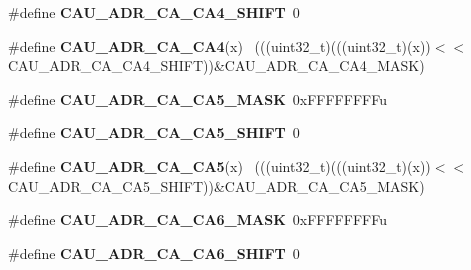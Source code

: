 \begin{DoxyCompactItemize}
\item 
\hypertarget{group___c_a_u___register___masks_gacd7b74188dccfc62f26f78229fb8a766}{}\#define {\bfseries C\+A\+U\+\_\+\+A\+D\+R\+\_\+\+C\+A\+\_\+\+C\+A4\+\_\+\+S\+H\+I\+F\+T}~0\label{group___c_a_u___register___masks_gacd7b74188dccfc62f26f78229fb8a766}

\item 
\hypertarget{group___c_a_u___register___masks_gae8de6a5050a639397216f6c4c5280f37}{}\#define {\bfseries C\+A\+U\+\_\+\+A\+D\+R\+\_\+\+C\+A\+\_\+\+C\+A4}(x)                                            ~(((uint32\+\_\+t)(((uint32\+\_\+t)(x))$<$$<$C\+A\+U\+\_\+\+A\+D\+R\+\_\+\+C\+A\+\_\+\+C\+A4\+\_\+\+S\+H\+I\+F\+T))\&C\+A\+U\+\_\+\+A\+D\+R\+\_\+\+C\+A\+\_\+\+C\+A4\+\_\+\+M\+A\+S\+K)\label{group___c_a_u___register___masks_gae8de6a5050a639397216f6c4c5280f37}

\item 
\hypertarget{group___c_a_u___register___masks_ga75b64822c5faed17c8032081d5ba9de7}{}\#define {\bfseries C\+A\+U\+\_\+\+A\+D\+R\+\_\+\+C\+A\+\_\+\+C\+A5\+\_\+\+M\+A\+S\+K}~0x\+F\+F\+F\+F\+F\+F\+F\+Fu\label{group___c_a_u___register___masks_ga75b64822c5faed17c8032081d5ba9de7}

\item 
\hypertarget{group___c_a_u___register___masks_ga172ed7376ee2f81527fc39ed02ac8925}{}\#define {\bfseries C\+A\+U\+\_\+\+A\+D\+R\+\_\+\+C\+A\+\_\+\+C\+A5\+\_\+\+S\+H\+I\+F\+T}~0\label{group___c_a_u___register___masks_ga172ed7376ee2f81527fc39ed02ac8925}

\item 
\hypertarget{group___c_a_u___register___masks_gaa705ff77b998deb4e05b433431ca775f}{}\#define {\bfseries C\+A\+U\+\_\+\+A\+D\+R\+\_\+\+C\+A\+\_\+\+C\+A5}(x)                                            ~(((uint32\+\_\+t)(((uint32\+\_\+t)(x))$<$$<$C\+A\+U\+\_\+\+A\+D\+R\+\_\+\+C\+A\+\_\+\+C\+A5\+\_\+\+S\+H\+I\+F\+T))\&C\+A\+U\+\_\+\+A\+D\+R\+\_\+\+C\+A\+\_\+\+C\+A5\+\_\+\+M\+A\+S\+K)\label{group___c_a_u___register___masks_gaa705ff77b998deb4e05b433431ca775f}

\item 
\hypertarget{group___c_a_u___register___masks_gaadd7000eac5326b13aa96c5823005731}{}\#define {\bfseries C\+A\+U\+\_\+\+A\+D\+R\+\_\+\+C\+A\+\_\+\+C\+A6\+\_\+\+M\+A\+S\+K}~0x\+F\+F\+F\+F\+F\+F\+F\+Fu\label{group___c_a_u___register___masks_gaadd7000eac5326b13aa96c5823005731}

\item 
\hypertarget{group___c_a_u___register___masks_gad8dbe87fc33b130d08642de3a23246a2}{}\#define {\bfseries C\+A\+U\+\_\+\+A\+D\+R\+\_\+\+C\+A\+\_\+\+C\+A6\+\_\+\+S\+H\+I\+F\+T}~0\label{group___c_a_u___register___masks_gad8dbe87fc33b130d08642de3a23246a2}


\end{DoxyCompactItemize}

